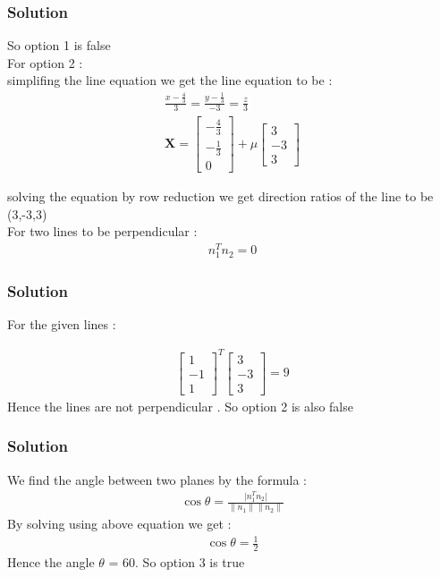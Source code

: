 \documentclass{beamer}
\begin{document}
\begin{frame}
\frametitle{Solution}
So option 1 is false\\
For option 2 :\\
simplifing the line equation we get the line equation to be :
\begin{align}
 \frac{x-\frac{4}{3}}{3} = \frac{y - \frac{1}{3}}{-3} = \frac{z}{3}\\
 \textbf{X} = \begin{bmatrix}-\frac{4}{3}\\- \frac{1}{3}\\0\end{bmatrix} + \mu\begin{bmatrix}3\\-3\\3\end{bmatrix}
\end{align}

solving the equation by row reduction we get  direction ratios of the line to be (3,-3,3) \\
For two lines to be perpendicular :
\begin{align}
   n_1^{T}n_2 = 0
\end{align}

\end{frame}

\begin{frame}
\frametitle{Solution}
For the given lines :

\begin{align}
  \begin{bmatrix}1\\-1\\1\end{bmatrix}^{T} \begin{bmatrix}3 \\-3\\3\end{bmatrix} = 9 
\end{align}
Hence the lines are not perpendicular . So option 2 is also false 

\end{frame}
\begin{frame}
\frametitle{Solution}
We find the angle between two planes by the formula :
\begin{align}
    \cos\theta = \frac{\lvert n_1^{T}n_2 \rvert}{\lVert n_1\rVert\lVert n_2\rVert}
\end{align}
By solving using above equation we get :
\begin{align}
    \cos\theta = \frac{1}{2}
\end{align}
Hence the angle $\theta$ = 60\degree . So option 3 is true 
\end{frame}
\end{document}

